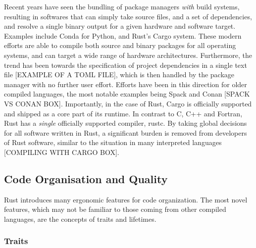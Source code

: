
Recent years have seen the bundling of package managers \textit{with} build systems, resulting in softwares that can simply take source files, and a set of dependencies, and resolve a single binary output for a given hardware and software target. Examples include Conda for Python, and Rust's Cargo system. These modern efforts are able to compile both source and binary packages for all operating systems, and can target a wide range of hardware architectures. Furthermore, the trend has been towards the specification of project dependencies in a single text file [EXAMPLE OF A TOML FILE], which is then handled by the package manager with no further user effort. Efforts have been in this direction for older compiled languages, the most notable examples being Spack and Conan [SPACK VS CONAN BOX]. Importantly, in the case of Rust, Cargo is officially supported and shipped as a core part of its runtime. In contrast to C, C++ and Fortran, Rust has a \textit{single} officially supported compiler, rustc. By taking global decisions for all software written in Rust, a significant burden is removed from developers of Rust software, similar to the situation in many interpreted languages [COMPILING WITH CARGO BOX].




\subsection*{Code Organisation and Quality}

Rust introduces many ergonomic features for code organization. The most novel features, which may not be familiar to those coming from other compiled languages, are the concepts of traits and lifetimes.

\subsubsection*{Traits}

